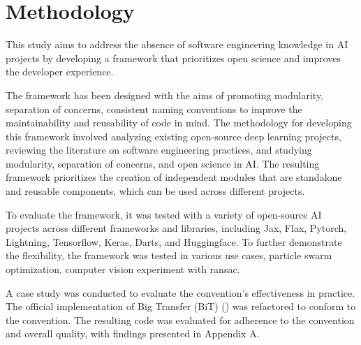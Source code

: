 


\section{Methodology}

This study aims to address the absence of software engineering knowledge in AI projects by developing a framework that prioritizes open science and improves the developer experience. 


The framework has been designed with the aims of promoting modularity, separation of concerns, consistent naming conventions to improve the maintainability and reusability of code in mind. The methodology for developing this framework involved analyzing existing open-source deep learning projects, reviewing the literature on software engineering practices, and studying modularity, separation of concerns, and open science in AI. The resulting framework prioritizes the creation of independent modules that are standalone and reusable components, which can be used across different projects.



To evaluate the framework, it was tested with a variety of open-source AI projects across different frameworks and libraries, including Jax, Flax, Pytorch, Lightning, Tensorflow, Keras, Darts, and Huggingface. To further demonstrate the flexibility, the framework was tested in various use cases, particle swarm optimization, computer vision experiment with ransac.

A case study was conducted to evaluate the convention's effectiveness in practice. The official implementation of Big Transfer (BiT)  (\cite{transferlearning}) was refactored to conform to the convention. The resulting code was evaluated for adherence to the convention and overall quality, with findings presented in Appendix A.

